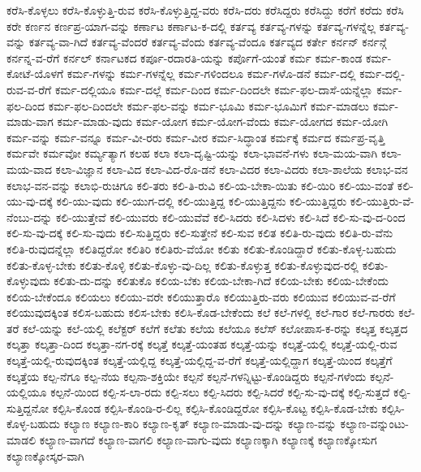 {ಕರೆಸಿ-ಕೊಳ್ಳಲು
ಕರೆಸಿ-ಕೊಳ್ಳುತ್ತಿ-ರುವ
ಕರೆಸಿ-ಕೊಳ್ಳುತ್ತಿದ್ದ-ವರು
ಕರೆಸಿ-ದರು
ಕರೆಸಿದ್ದರು
ಕರೆಸಿದ್ದು
ಕರೆಗೆ
ಕರೆದು
ಕರೆಸಿ
ಕರೇ
ಕರ್ಣನ
ಕರ್ಣಪ್ರ-ಯಾಗ-ವನ್ನು
ಕರ್ಣಾಟ
ಕರ್ಣಾಟ-ಕ-ದಲ್ಲಿ
ಕರ್ತವ್ಯ
ಕರ್ತವ್ಯ-ಗಳನ್ನು
ಕರ್ತವ್ಯ-ಗಳನ್ನೆಲ್ಲ
ಕರ್ತವ್ಯ-ವನ್ನು
ಕರ್ತವ್ಯ-ವಾ-ಗಿದೆ
ಕರ್ತವ್ಯ-ವೆಂದರೆ
ಕರ್ತವ್ಯ-ವೆಂದು
ಕರ್ತವ್ಯ-ವೆಂದೂ
ಕರ್ತವ್ಯದ
ಕರ್ತೇ
ಕರ್ನನ್
ಕರ್ನನ್ಗೆ
ಕರ್ನನ್ನ-ವ-ರೆಗೆ
ಕರ್ನಲ್
ಕರ್ನಾಟಕದ
ಕರ್ಪೂ-ರದಾರತಿ-ಯನ್ನು
ಕರ್ಪೊಗೆ-ಯಂತೆ
ಕರ್ಮ
ಕರ್ಮ-ಕಾಂಡ
ಕರ್ಮ-ಕೋಟೆ-ಯೊಳಗೆ
ಕರ್ಮ-ಗಳನ್ನು
ಕರ್ಮ-ಗಳನ್ನೆಲ್ಲ
ಕರ್ಮ-ಗಳಿಂದಲೂ
ಕರ್ಮ-ಗಳೊ-ಡನೆ
ಕರ್ಮ-ದಲ್ಲಿ
ಕರ್ಮ-ದಲ್ಲಿ-ರುವ-ವ-ರೆಗೆ
ಕರ್ಮ-ದಲ್ಲಿಯೂ
ಕರ್ಮ-ದಲ್ಲೆ
ಕರ್ಮ-ದಿಂದ
ಕರ್ಮ-ದಿಂದಲೇ
ಕರ್ಮ-ಫಲ-ದಾಸೆ-ಯನ್ನೆಲ್ಲಾ
ಕರ್ಮ-ಫಲ-ದಿಂದ
ಕರ್ಮ-ಫಲ-ದಿಂದಲೇ
ಕರ್ಮ-ಫಲ-ವನ್ನು
ಕರ್ಮ-ಭೂಮಿ
ಕರ್ಮ-ಭೂಮಿಗೆ
ಕರ್ಮ-ಮಾಡಲು
ಕರ್ಮ-ಮಾಡು-ವಾಗ
ಕರ್ಮ-ಮಾಡು-ವುದು
ಕರ್ಮ-ಯೋಗ
ಕರ್ಮ-ಯೋಗ-ವೆಂದು
ಕರ್ಮ-ಯೋಗದ
ಕರ್ಮ-ಯೋಗಿ
ಕರ್ಮ-ವನ್ನು
ಕರ್ಮ-ವನ್ನೂ
ಕರ್ಮ-ವೀ-ರರು
ಕರ್ಮ-ವೀರ
ಕರ್ಮ-ಸಿದ್ಧಾಂತ
ಕರ್ಮಕ್ಕೆ
ಕರ್ಮದ
ಕರ್ಮಪ್ರ-ವೃತ್ತಿ
ಕರ್ಮವೇ
ಕರ್ಮವೋ
ಕರ್ಮ್ಯತ್ಯಾಗ
ಕಲಹ
ಕಲಾ
ಕಲಾ-ದೃಷ್ಟಿ-ಯನ್ನು
ಕಲಾ-ಭಾವನೆ-ಗಳು
ಕಲಾ-ಮಯ-ವಾಗಿ
ಕಲಾ-ಮಯ-ವಾದ
ಕಲಾ-ವಿಜ್ಞಾನ
ಕಲಾ-ವಿದ
ಕಲಾ-ವಿದ-ರೊ-ಡನೆ
ಕಲಾ-ವಿದರ
ಕಲಾ-ವಿದರು
ಕಲಾ-ಶಾಲೆಯ
ಕಲಾಭ-ವನ
ಕಲಾಭ-ವನ-ವನ್ನು
ಕಲಾಭಿ-ರುಚಿಗೂ
ಕಲಿ-ತರು
ಕಲಿ-ತಿ-ರುವಿ
ಕಲಿ-ಯ-ಬೇಕಾ-ಯಿತು
ಕಲಿ-ಯಿರಿ
ಕಲಿ-ಯು-ವಂತೆ
ಕಲಿ-ಯು-ವು-ದಕ್ಕೆ
ಕಲಿ-ಯು-ವುದು
ಕಲಿ-ಯುಗ-ದಲ್ಲಿ
ಕಲಿ-ಯುತ್ತಿದ್ದ
ಕಲಿ-ಯುತ್ತಿದ್ದನು
ಕಲಿ-ಯುತ್ತಿದ್ದರು
ಕಲಿ-ಯುತ್ತಿರು-ವೆ-ನೆಂಬು-ದನ್ನು
ಕಲಿ-ಯುತ್ತೇವೆ
ಕಲಿ-ಯುವರು
ಕಲಿ-ಯುವೆವೆ
ಕಲಿ-ಸಿದರು
ಕಲಿ-ಸಿದಳು
ಕಲಿ-ಸಿದೆ
ಕಲಿ-ಸು-ವು-ದ-ರಿಂದ
ಕಲಿ-ಸು-ವು-ದಕ್ಕೆ
ಕಲಿ-ಸು-ವುದು
ಕಲಿ-ಸುತ್ತಿದ್ದರು
ಕಲಿ-ಸುತ್ತೇನೆ
ಕಲಿ-ಸುವ
ಕಲಿತ
ಕಲಿತಿ-ರು-ವುದು
ಕಲಿತಿ-ರು-ವೆನು
ಕಲಿತಿ-ರುವುದನ್ನೆಲ್ಲಾ
ಕಲಿತಿದ್ದರೋ
ಕಲಿತಿರಿ
ಕಲಿತಿರು-ವೆಯೋ
ಕಲಿತು
ಕಲಿತು-ಕೊಂಡಿದ್ದಾರೆ
ಕಲಿತು-ಕೊಳ್ಳ-ಬಹುದು
ಕಲಿತು-ಕೊಳ್ಳ-ಬೇಕು
ಕಲಿತು-ಕೊಳ್ಳಿ
ಕಲಿತು-ಕೊಳ್ಳು-ವು-ದಿಲ್ಲ
ಕಲಿತು-ಕೊಳ್ಳುತ್ತ
ಕಲಿತು-ಕೊಳ್ಳುವುದ-ರಲ್ಲಿ
ಕಲಿತು-ಕೊಳ್ಳುವುದು
ಕಲಿತು-ದು-ದನ್ನು
ಕಲಿತುಕೊ
ಕಲಿಯ-ಬೆಕು
ಕಲಿಯ-ಬೇಕಾ-ಗಿದೆ
ಕಲಿಯ-ಬೇಕು
ಕಲಿಯ-ಬೇಕೆಂದು
ಕಲಿಯ-ಬೇಕೆಂದೂ
ಕಲಿಯಲು
ಕಲಿಯು-ವರೇ
ಕಲಿಯುತ್ತಾರೊ
ಕಲಿಯುತ್ತಿರು-ವರು
ಕಲಿಯುವ
ಕಲಿಯುವ-ವ-ರೆಗೆ
ಕಲಿಯುವುದಕ್ಕಿಂತ
ಕಲಿಸ-ಬಹುದು
ಕಲಿಸ-ಬೇಕು
ಕಲಿಸಿ-ಕೊಡ-ಬೇಕೆಂದು
ಕಲೆ
ಕಲೆ-ಗಳಲ್ಲಿ
ಕಲೆ-ಗಾರ
ಕಲೆ-ಗಾರರು
ಕಲೆ-ತರೆ
ಕಲೆ-ಯನ್ನು
ಕಲೆ-ಯಲ್ಲಿ
ಕಲೆಕ್ಟರ್
ಕಲೆಗೆ
ಕಲೆತು
ಕಲೆಯ
ಕಲೆಯೂ
ಕಲೆಸ್
ಕಲೋಪಾಸ-ಕ-ರನ್ನು
ಕಲ್ಕತ್ತ
ಕಲ್ಕತ್ತದ
ಕಲ್ಕತ್ತಾ
ಕಲ್ಕತ್ತಾ-ದಿಂದ
ಕಲ್ಕತ್ತಾ-ನಗ-ರಕ್ಕೆ
ಕಲ್ಕತ್ತೆ
ಕಲ್ಕತ್ತೆ-ಯಂತಹ
ಕಲ್ಕತ್ತೆ-ಯನ್ನು
ಕಲ್ಕತ್ತೆ-ಯಲ್ಲಿ
ಕಲ್ಕತ್ತೆ-ಯಲ್ಲಿ-ರುವ
ಕಲ್ಕತ್ತೆ-ಯಲ್ಲಿ-ರುವುದಕ್ಕಿಂತ
ಕಲ್ಕತ್ತೆ-ಯಲ್ಲಿದ್ದ
ಕಲ್ಕತ್ತೆ-ಯಲ್ಲಿದ್ದ-ವ-ರೆಗೆ
ಕಲ್ಕತ್ತೆ-ಯಲ್ಲಿದ್ದಾಗ
ಕಲ್ಕತ್ತೆ-ಯಿಂದ
ಕಲ್ಕತ್ತೆಗೆ
ಕಲ್ಕತ್ತೆಯ
ಕಲ್ಪ-ನೆಗೂ
ಕಲ್ಪ-ನೆಯ
ಕಲ್ಪನಾ-ಶಕ್ತಿಯೇ
ಕಲ್ಪನೆ
ಕಲ್ಪನೆ-ಗಳನ್ನಿಟ್ಟು-ಕೊಂಡಿದ್ದರು
ಕಲ್ಪನೆ-ಗಳೆಂದು
ಕಲ್ಪನೆ-ಯಲ್ಲಿಯೂ
ಕಲ್ಪನೆ-ಯಿಂದ
ಕಲ್ಪಿ-ಸ-ಲಾ-ರದು
ಕಲ್ಪಿ-ಸಲು
ಕಲ್ಪಿ-ಸಿದರು
ಕಲ್ಪಿ-ಸಿದರೆ
ಕಲ್ಪಿ-ಸು-ವು-ದಕ್ಕೆ
ಕಲ್ಪಿ-ಸುತ್ತದೆ
ಕಲ್ಪಿ-ಸುತ್ತಿದ್ದನೋ
ಕಲ್ಪಿಸಿ-ಕೊಂಡ
ಕಲ್ಪಿಸಿ-ಕೊಂಡಿ-ರ-ಲಿಲ್ಲ
ಕಲ್ಪಿಸಿ-ಕೊಂಡಿದ್ದರೋ
ಕಲ್ಪಿಸಿ-ಕೊಟ್ಟ
ಕಲ್ಪಿಸಿ-ಕೊಡ-ಬೇಕು
ಕಲ್ಪಿಸಿ-ಕೊಳ್ಳ-ಬಹುದು
ಕಲ್ಯಾಣ
ಕಲ್ಯಾಣ-ಕಾರಿ
ಕಲ್ಯಾಣ-ಕೃತ್
ಕಲ್ಯಾಣ-ಮಾಡು-ವು-ದನ್ನು
ಕಲ್ಯಾಣ-ವನ್ನು
ಕಲ್ಯಾಣ-ವನ್ನುಂಟು-ಮಾಡಲಿ
ಕಲ್ಯಾಣ-ವಾಗದೆ
ಕಲ್ಯಾಣ-ವಾಗಲಿ
ಕಲ್ಯಾಣ-ವಾಗು-ವುದು
ಕಲ್ಯಾಣಕ್ಕಾಗಿ
ಕಲ್ಯಾಣಕ್ಕೆ
ಕಲ್ಯಾಣಕ್ಕೋಸುಗ
ಕಲ್ಯಾಣಕ್ಕೋಸ್ಕರ-ವಾಗಿ
}
